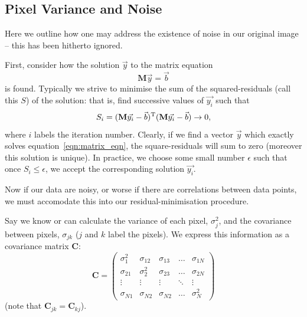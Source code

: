 \documentclass[letterpaper, 11pt]{article}
\def\ra{\ensuremath{\rightarrow}\xspace}
\begin{document}
\subsection{Pixel Variance and Noise}
\label{sec:pixvar}

Here we outline how one may address the existence of noise in our original image -- this has been hitherto ignored.

First, consider how the solution $\vec y$ to the matrix equation
\begin{equation}
	\mathbf M \vec y = \vec b \label{eqn:matrix_eqn}
\end{equation}
is found. Typically we strive to minimise the sum of the squared-residuals (call this $S$) of the solution: that is, find successive values of $\vec {y_i}$ such that
\begin{equation} \label{eqn:sum_residuals}
	S_i = (\mathbf M \vec{y_i} - \vec b)^{\rm T}(\mathbf M \vec{y_i} - \vec b) \ra 0,
\end{equation}
where $i$ labels the iteration number. Clearly, if we find a vector $\vec y$ which exactly solves equation~\ref{eqn:matrix_eqn}, the square-residuals will sum to zero (moreover this solution is unique). In practice, we choose some small number $\epsilon$ such that once $S_i \leq \epsilon$, we accept the corresponding solution $\vec {y_i}$.

Now if our data are noisy, or worse if there are correlations between data points, we must accomodate this into our residual-minimisation procedure.

Say we know or can calculate the variance of each pixel, $\sigma_j^2$, and the covariance between pixels, $\sigma_{jk}$ ($j$ and $k$ label the pixels).  We express this information as a covariance matrix $\mathbf{C}$:
\begin{equation}
	\mathbf{C} =
	\begin{pmatrix}
		\sigma_1^2	& \sigma_{12}	& \sigma_{13}	& \ldots	& \sigma_{1N}\\
		\sigma_{21}	& \sigma_2^2	& \sigma_{23}	& \ldots 	& \sigma_{2N}\\
		\vdots		& \vdots 		&  \vdots		& \ddots & \vdots \\
		\sigma_{N1}	& \sigma_{N2} 	& \sigma_{N2}	& \ldots	& \sigma_N^2
	\end{pmatrix}
\end{equation}
(note that $\mathbf{C}_{jk}=\mathbf{C}_{kj}$).
\end{document}

